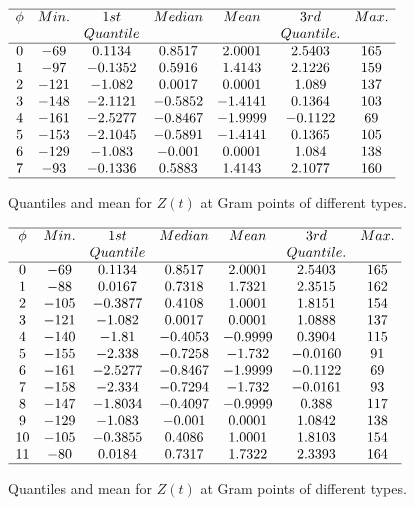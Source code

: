 \documentclass[twoside]{article}
\theoremstyle{definition}
\begin{document}
\begin{table}
\centering \(\begin{array}{ccccccc}
\hline
 \phi &     Min.   & 1st    &  Median    &   Mean   & 3rd    &   Max. \\
 &              & Quantile   &            &              & Quantile.    &   \\
\hline
0 &-69 &0.1134 &0.8517 &2.0001 &2.5403 &165  \\
1 &-97 &-0.1352 &0.5916 &1.4143 &2.1226 &159 \\
2 &-121 &-1.082 &0.0017 &0.0001 &1.089 &137 \\
3 &-148 &-2.1121 &-0.5852 &-1.4141 &0.1364 &103 \\
4 &-161 &-2.5277 &-0.8467 &-1.9999 &-0.1122 &69 \\
5 &-153 &-2.1045 &-0.5891 &-1.4141 &0.1365 &105 \\
6 &-129 &-1.083 &-0.001 &0.0001 &1.084 &138 \\
7 &-93 &-0.1336 &0.5883 &1.4143 &2.1077 &160 \\
\hline
\end{array}\)
\caption{Quantiles and mean for  $Z(t)$ at Gram points of different types.} 
\label{tab:quantiles}
\end{table}


\begin{table}
\centering \(\begin{array}{ccccccc}
\hline
 \phi &     Min.   & 1st    &  Median    &   Mean   & 3rd    &   Max. \\
  &              & Quantile   &            &              & Quantile.    &   \\
\hline
0 & -69 & 0.1134 & 0.8517 & 2.0001 & 2.5403 & 165 \\
1 & -88 & 0.0167 & 0.7318 & 1.7321 & 2.3515 & 162\\
2 & -105 & -0.3877 & 0.4108 & 1.0001 & 1.8151 & 154\\
3 & -121 & -1.082 & 0.0017 & 0.0001 & 1.0888 & 137\\
4 & -140 & -1.81 & -0.4053 & -0.9999 & 0.3904 & 115 \\
5 & -155 & -2.338 & -0.7258 & -1.732 & -0.0160 & 91\\
6 & -161 & -2.5277 & -0.8467 & -1.9999 & -0.1122 & 69\\
7 & -158 & -2.334 & -0.7294 & -1.732 & -0.0161 & 93\\
8 & -147 & -1.8034 & -0.4097 & -0.9999 & 0.388 & 117\\
9 & -129 & -1.083 & -0.001 & 0.0001 & 1.0842 & 138\\
10 & -105 & -0.3855 & 0.4086 & 1.0001 & 1.8103 & 154\\
11 & -80 & 0.0184 & 0.7317 & 1.7322 & 2.3393 & 164 \\
\hline
\end{array}\)
\caption{Quantiles and mean for  $Z(t)$ at Gram points of different types.}
\label{tab:quantiles6}
\end{table}
\end{document}
